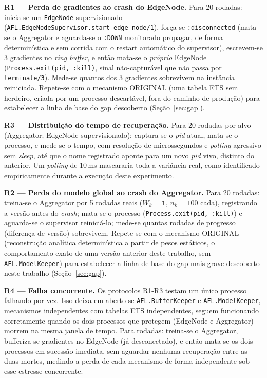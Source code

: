 \documentclass[conference,a4paper]{IEEEtran}
\begin{document}
\textbf{R1 --- Perda de gradientes ao crash do EdgeNode.} Para 20 rodadas:
inicia-se um \texttt{EdgeNode} supervisionado
(\texttt{AFL.EdgeNodeSupervisor.start\_edge\_node/1}), força-se
\texttt{:disconnected} (mata-se o Aggregator e aguarda-se o \texttt{:DOWN}
monitorado propagar, de forma determinística e sem corrida com o restart
automático do supervisor), escrevem-se 3 gradientes no \textit{ring
buffer}, e então mata-se o \emph{próprio} EdgeNode
(\texttt{Process.exit(pid, :kill)}, sinal não-capturável que não passa por
\texttt{terminate/3}). Mede-se quantos dos 3 gradientes sobrevivem na
instância reiniciada. Repete-se com o mecanismo ORIGINAL (uma tabela ETS
sem herdeiro, criada por um processo descartável, fora do caminho de
produção) para estabelecer a linha de base do gap descoberto
(Seção~\ref{sec:gap}).

\textbf{R3 --- Distribuição do tempo de recuperação.} Para 20 rodadas por
alvo (Aggregator; EdgeNode supervisionado): captura-se o \textit{pid}
atual, mata-se o processo, e mede-se o tempo, com resolução de microssegundos
e \textit{polling} agressivo sem \textit{sleep}, até que o nome registrado
aponte para um novo \textit{pid} vivo, distinto do anterior. Um
\textit{polling} de 10\,ms mascararia toda a variância real, como
identificado empiricamente durante a execução deste experimento.

\textbf{R2 --- Perda do modelo global ao crash do Aggregator.} Para 20
rodadas: treina-se o Aggregator por 5 rodadas reais
($W_k=\mathbf{1}$, $n_k=100$ cada), registrando a versão antes do
\textit{crash}; mata-se o processo (\texttt{Process.exit(pid, :kill)}) e
aguarda-se o supervisor reiniciá-lo; mede-se quantas rodadas de progresso
(diferença de versão) sobrevivem. Repete-se com o mecanismo ORIGINAL
(reconstrução analítica determinística a partir de pesos estáticos, o
comportamento exato de uma versão anterior deste trabalho, sem
\texttt{AFL.ModelKeeper}) para estabelecer a linha de base do gap mais
grave descoberto neste trabalho (Seção~\ref{sec:gap}).

\textbf{R4 --- Falha concorrente.} Os protocolos R1-R3 testam um único
processo falhando por vez. Isso deixa em aberto se
\texttt{AFL.BufferKeeper} e \texttt{AFL.ModelKeeper}, mecanismos
independentes com tabelas ETS independentes, seguem funcionando
corretamente quando os dois processos que protegem (EdgeNode e Aggregator)
morrem na mesma janela de tempo. Para \statExpRFourTrials{} rodadas:
treina-se o Aggregator, bufferiza-se gradientes no EdgeNode (já
desconectado), e então mata-se os dois processos em sucessão imediata, sem
aguardar nenhuma recuperação entre as duas mortes, medindo a perda de
cada mecanismo de forma independente sob esse estresse concorrente.
\end{document}
